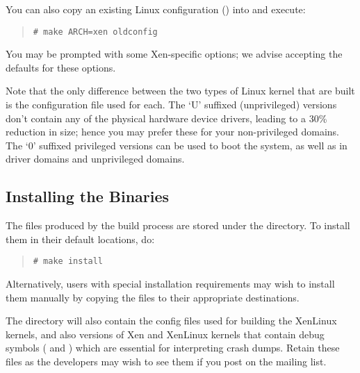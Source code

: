 You can also copy an existing Linux configuration ()
into  and execute:
\begin{quote}
\begin{verbatim}
# make ARCH=xen oldconfig
\end{verbatim}
\end{quote}

You may be prompted with some Xen-specific options; we advise
accepting the defaults for these options.

Note that the only difference between the two types of Linux kernel
that are built is the configuration file used for each.  The `U'
suffixed (unprivileged) versions don't contain any of the physical
hardware device drivers, leading to a 30\% reduction in size; hence
you may prefer these for your non-privileged domains.  The `0'
suffixed privileged versions can be used to boot the system, as well
as in driver domains and unprivileged domains.

\subsection{Installing the Binaries}

The files produced by the build process are stored under the
 directory. To install them in their default
locations, do:
\begin{quote}
\begin{verbatim}
# make install
\end{verbatim}
\end{quote}

Alternatively, users with special installation requirements may wish
to install them manually by copying the files to their appropriate
destinations.


The  directory will also contain the config
files used for building the XenLinux kernels, and also versions of Xen
and XenLinux kernels that contain debug symbols (
and ) which are essential for
interpreting crash dumps.  Retain these files as the developers may
wish to see them if you post on the mailing list.


